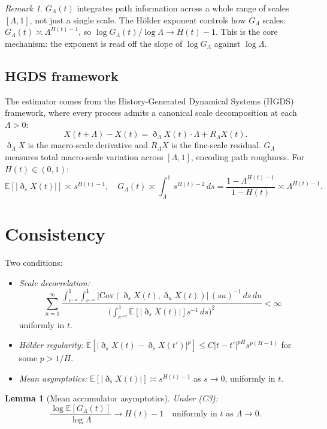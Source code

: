 \documentclass[11pt,a4paper]{article}
\newtheorem{lemma}[theorem]{Lemma}
\theoremstyle{definition}
\theoremstyle{remark}
\newtheorem{remark}[theorem]{Remark}
\newcommand{\E}{\mathbb{E}}
\newcommand{\GL}{G_\Lambda}
\begin{document}
\begin{remark}
$\GL(t)$ integrates path information across a whole range of scales
$[\Lambda,1]$, not just a single scale. The H\"{o}lder exponent
controls how $\GL$ scales:
$\GL(t)\asymp\Lambda^{H(t)-1}$, so $\log\GL(t)/\log\Lambda\to H(t)-1$.
This is the core mechanism: the exponent is read off the slope of
$\log\GL$ against $\log\Lambda$.
\end{remark}

\subsection{HGDS framework}

The estimator comes from the History-Generated Dynamical Systems (HGDS)
framework, where every process admits a canonical scale decomposition at
each $\Lambda>0$:
\[
  X(t+\Lambda)-X(t) = \eth_\Lambda X(t)\cdot\Lambda + R_\Lambda X(t).
\]
$\eth_\Lambda X$ is the macro-scale derivative and $R_\Lambda X$ is
the fine-scale residual. $\GL$ measures total macro-scale variation
across $[\Lambda,1]$, encoding path roughness. For $H(t)\in(0,1)$:
\[
  \E[|\eth_s X(t)|]\asymp s^{H(t)-1},\quad
  \GL(t)\asymp\int_\Lambda^1 s^{H(t)-2}\,ds
  = \frac{1-\Lambda^{H(t)-1}}{1-H(t)}\asymp\Lambda^{H(t)-1}.
\]

\section{Consistency}

Two conditions:
\begin{itemize}
\item[(C1)] \emph{Scale decorrelation:}
\[
  \sum_{n=1}^\infty
  \frac{\int_{e^{-n}}^1\!\int_{e^{-n}}^1
    |\mathrm{Cov}(\eth_s X(t),\eth_u X(t))|\,(su)^{-1}\,ds\,du}
  {\bigl(\int_{e^{-n}}^1\E[|\eth_s X(t)|]s^{-1}\,ds\bigr)^2}
  < \infty
\]
uniformly in $t$.
\item[(C2)] \emph{H\"{o}lder regularity:}
  $\E[|\eth_s X(t)-\eth_s X(t')|^p]\le C|t-t'|^{pH}s^{p(H-1)}$
  for some $p>1/H$.
\item[(C3)] \emph{Mean asymptotics:}
  $\E[|\eth_s X(t)|]\asymp s^{H(t)-1}$ as $s\to0$, uniformly in $t$.
\end{itemize}

\begin{lemma}[Mean accumulator asymptotics]\label{lem:mean}
Under (C3):
\[
  \frac{\log\E[\GL(t)]}{\log\Lambda}\to H(t)-1
  \quad\text{uniformly in }t\text{ as }\Lambda\to0.
\]
\end{lemma}
\end{document}
